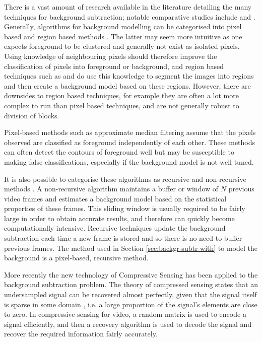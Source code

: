 There is a vast amount of research available  in the literature detailing the many techniques for background subtraction; notable comparative studies include \cite{Sen-Ching2004} and \cite{Piccardi2004a}. Generally, algorithms for background modelling  can be categorised into pixel based and region based methods  \cite{Bouwmans2011}. The latter may seem more intuitive as one expects foreground to be clustered and generally not exist as isolated pixels. Using knowledge of neighbouring pixels should therefore improve the classification of pixels into foreground or background, and region based techniques such as  \cite{elgammal2000} and \cite{toyama1999} do use this knowledge to segment the images into regions and then create a background model based on these regions. However, there are downsides to region based techniques, for example they are often a lot more complex to run than pixel based techniques, and are not generally robust to division of blocks.

Pixel-based methods such as approximate median filtering \cite{McFarlane1995} assume that the pixels observed are classified as foreground independently of each other. These methods can often detect the contours of foreground well but may be susceptible to making false classifications, especially if the background model is not well tuned.  

It is also possible to categorise these algorithms as recursive and non-recursive methods \cite{Bouwmans2011}. A non-recursive algorithm maintains a buffer or window of $N$ previous video frames and estimates a background model based on the statistical properties of these frames. This sliding window is usually required to be fairly large in order to obtain accurate results, and therefore can quickly become computationally intensive. Recursive techniques update the background subtraction each time a new frame is stored and so there is no need to buffer previous frames. The method used in Section \ref{sec:backgr-subtr-with} to model the background is a pixel-based, recursive method.

More recently the new technology of Compressive Sensing \cite{Candes2006, Candes2006a, Donoho2006} has been applied to the background subtraction problem. The theory of compressed sensing states that an undersampled signal can be recovered almost perfectly, given that the signal itself is sparse in some domain \cite{Baraniuk2007}, i.e. a large proportion of the signal's elements are close to zero. In compressive sensing for video, a random matrix is used to encode a signal efficiently, and then a recovery algorithm is used to decode the signal and recover the required information fairly accurately. 

